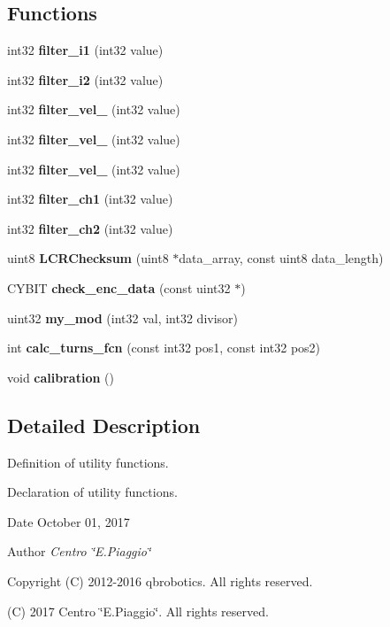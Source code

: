 \subsection*{Functions}
\begin{DoxyCompactItemize}
\item 
\mbox{\label{utils_8h_a3588bc1aa14c6ea245387dda7eb7ffbe}} 
int32 {\bfseries filter\+\_\+i1} (int32 value)
\item 
\mbox{\label{utils_8h_ac9c746215432427ee4e8d7dbb84b1c1a}} 
int32 {\bfseries filter\+\_\+i2} (int32 value)
\item 
\mbox{\label{utils_8h_ad378840ee71c2d41d2d4f1a84465c7f3}} 
int32 {\bfseries filter\+\_\+vel\+\_} (int32 value)
\item 
\mbox{\label{utils_8h_abda54d76e676bb1cb27b5577bd0fe099}} 
int32 {\bfseries filter\+\_\+vel\+\_} (int32 value)
\item 
\mbox{\label{utils_8h_a70430ee90ed28e4c9fca0c4ca3d6583e}} 
int32 {\bfseries filter\+\_\+vel\+\_} (int32 value)
\item 
\mbox{\label{utils_8h_ae143e439a41178d1cf10da4920488f86}} 
int32 {\bfseries filter\+\_\+ch1} (int32 value)
\item 
\mbox{\label{utils_8h_a45f7702bcbea56e0d255f6a615e6b8ae}} 
int32 {\bfseries filter\+\_\+ch2} (int32 value)
\item 
\mbox{\label{utils_8h_ae9ef936ba30a0a1b2cf52b8fb7f07656}} 
uint8 {\bfseries L\+C\+R\+Checksum} (uint8 $\ast$data\+\_\+array, const uint8 data\+\_\+length)
\item 
\mbox{\label{utils_8h_a8f6aff189d5fbbb0be1fdd13e0e720c0}} 
C\+Y\+B\+IT {\bfseries check\+\_\+enc\+\_\+data} (const uint32 $\ast$)
\item 
\mbox{\label{utils_8h_a01d3bb6c1fd469a6c530fb296e4fe0fe}} 
uint32 {\bfseries my\+\_\+mod} (int32 val, int32 divisor)
\item 
\mbox{\label{utils_8h_afa68f255d25478e463690f63d529c29d}} 
int {\bfseries calc\+\_\+turns\+\_\+fcn} (const int32 pos1, const int32 pos2)
\item 
\mbox{\label{utils_8h_a6d9dc88d64cd1f74a30fd0e404a3bb31}} 
void {\bfseries calibration} ()
\end{DoxyCompactItemize}


\subsection{Detailed Description}
Definition of utility functions. 

Declaration of utility functions.

\begin{DoxyDate}{Date}
October 01, 2017 
\end{DoxyDate}
\begin{DoxyAuthor}{Author}
{\itshape Centro \char`\"{}\+E.\+Piaggio\char`\"{}} 
\end{DoxyAuthor}
\begin{DoxyCopyright}{Copyright}
(C) 2012-\/2016 qbrobotics. All rights reserved. 

(C) 2017 Centro \char`\"{}\+E.\+Piaggio\char`\"{}. All rights reserved. 
\end{DoxyCopyright}
